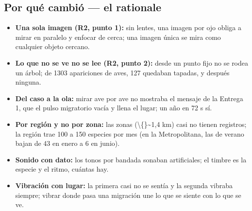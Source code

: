 \documentclass[11pt,a4paper]{article}
\begin{document}
\subsection*{Por qué cambió --- el rationale}
\begin{itemize}
\item \textbf{Una sola imagen (R2, punto 1):} sin lentes, una imagen por ojo obliga a mirar en paralelo y enfocar de cerca; una imagen única se mira como cualquier objeto cercano.
\item \textbf{Lo que no se ve no se lee (R2, punto 2):} desde un punto fijo no se rodea un árbol; de 1303 apariciones de aves, 127 quedaban tapadas, y después ninguna.
\item \textbf{Del caso a la ola:} mirar ave por ave no mostraba el mensaje de la Entrega 1, que el pulso migratorio vacía y llena el lugar; un año en 72 s sí.
\item \textbf{Por región y no por zona:} las zonas (\textbackslash\{\}\textasciitilde{}1,4 km) casi no tienen registros; la región trae 100 a 150 especies por mes (en la Metropolitana, las de verano bajan de 43 en enero a 6 en junio).
\item \textbf{Sonido con dato:} los tonos por bandada sonaban artificiales; el timbre es la especie y el ritmo, cuántas hay.
\item \textbf{Vibración con lugar:} la primera casi no se sentía y la segunda vibraba siempre; vibrar donde pasa una migración une lo que se siente con lo que se ve.
\end{itemize}
\end{document}
